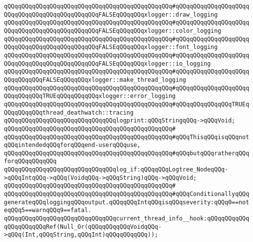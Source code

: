 \verb|qQQqqQQqqQQqqQQqqQQqqQQqqQQqqQQqqQQqqQQqqQQqqQQq#qQQqqQQqqQQqqQQqqQQqqQQqqQQqqQQqqQQqqQQqqQQqqQQqFALSEqQQqqQQqxlogger::draw_logging|\newline
\verb|qQQqqQQqqQQqqQQqqQQqqQQqqQQqqQQqqQQqqQQqqQQqqQQq#qQQqqQQqqQQqqQQqqQQqqQQqqQQqqQQqqQQqqQQqqQQqqQQqFALSEqQQqqQQqxlogger::color_logging|\newline
\verb|qQQqqQQqqQQqqQQqqQQqqQQqqQQqqQQqqQQqqQQqqQQqqQQq#qQQqqQQqqQQqqQQqqQQqqQQqqQQqqQQqqQQqqQQqqQQqqQQqFALSEqQQqqQQqxlogger::font_logging|\newline
\verb|qQQqqQQqqQQqqQQqqQQqqQQqqQQqqQQqqQQqqQQqqQQqqQQq#qQQqqQQqqQQqqQQqqQQqqQQqqQQqqQQqqQQqqQQqqQQqqQQqFALSEqQQqqQQqxlogger::io_logging|\newline
\verb|qQQqqQQqqQQqqQQqqQQqqQQqqQQqqQQqqQQqqQQqqQQqqQQq#qQQqqQQqqQQqqQQqqQQqqQQqqQQqqQQqFALSEqQQqqQQqxlogger::make_thread_logging|\newline
\verb|qQQqqQQqqQQqqQQqqQQqqQQqqQQqqQQqqQQqqQQqqQQqqQQq#qQQqqQQqqQQqqQQqqQQqqQQqqQQqqQQqTRUEqQQqqQQqqQQqxlogger::error_logging|\newline
\verb|qQQqqQQqqQQqqQQqqQQqqQQqqQQqqQQqqQQqqQQqqQQqqQQq#qQQqqQQqqQQqqQQqTRUEqQQqqQQqqQQqthread_deathwatch::tracing|\newline
\newline
\verb|qQQqqQQqqQQqqQQqqQQqqQQqqQQqqQQqlogprint:qQQqStringqQQq->qQQqVoid;|\newline
\verb|qQQqqQQqqQQqqQQqqQQqqQQqqQQqqQQqqQQqqQQqqQQqqQQq#|\newline
\verb|qQQqqQQqqQQqqQQqqQQqqQQqqQQqqQQqqQQqqQQqqQQqqQQq#qQQqThisqQQqisqQQqnotqQQqintendedqQQqforqQQqend-userqQQquse,|\newline
\verb|qQQqqQQqqQQqqQQqqQQqqQQqqQQqqQQqqQQqqQQqqQQqqQQq#qQQqbutqQQqratherqQQqforqQQqqQQqqQQq|\newline
\newline
\verb|qQQqqQQqqQQqqQQqqQQqqQQqqQQqqQQqlog_if:qQQqqQQqLogtree_NodeqQQq->qQQqIntqQQq->qQQq(VoidqQQq->qQQqString)qQQq->qQQqVoid;|\newline
\verb|qQQqqQQqqQQqqQQqqQQqqQQqqQQqqQQqqQQqqQQqqQQqqQQq#|\newline
\verb|qQQqqQQqqQQqqQQqqQQqqQQqqQQqqQQqqQQqqQQqqQQqqQQq#qQQqConditionallyqQQqgenerateqQQqloggingqQQqoutput.qQQqqQQqIntqQQqisqQQqseverity:qQQq0==noteqQQq5==warnqQQq9==fatal.|\newline
\newline
\verb|qQQqqQQqqQQqqQQqqQQqqQQqqQQqqQQqcurrent_thread_info__hook:qQQqqQQqqQQqqQQqqQQqqQQqRef(Null_Or(qQQqqQQqqQQqVoidqQQq->qQQq(Int,qQQqString,qQQqInt)qQQqqQQqqQQq));|\newline
